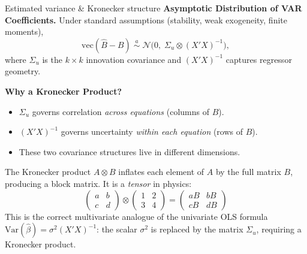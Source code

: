 \documentclass{beamer}
\begin{document}
\begin{frame}{Estimated variance \& Kronecker structure}
\small
\textbf{Asymptotic Distribution of VAR Coefficients.}
Under standard assumptions (stability, weak exogeneity, finite moments),
\[
\mathrm{vec}(\widehat{B}-B)
\;\overset{a}{\sim}\;
\mathcal{N}\!\big(0,\;\Sigma_u \otimes (X'X)^{-1}\big),
\]
where $\Sigma_u$ is the $k\times k$ innovation covariance and $(X'X)^{-1}$ captures regressor geometry.

\medskip

\textbf{Why a Kronecker Product?}
\begin{itemize}
\item $\Sigma_u$ governs correlation \emph{across equations} (columns of $B$).
\item $(X'X)^{-1}$ governs uncertainty \emph{within each equation} (rows of $B$).
\item These two covariance structures live in different dimensions.
\end{itemize}

The Kronecker product $A\otimes B$ inflates each element of $A$ by the full
matrix $B$, producing a block matrix. It is a \textit{tensor} in physics:
\[
\begin{pmatrix}
a & b \\ c & d
\end{pmatrix}
\otimes
\begin{pmatrix}
1 & 2 \\ 3 & 4
\end{pmatrix}
=
\begin{pmatrix}
aB & bB\\
cB & dB
\end{pmatrix}
\]
This is the correct multivariate analogue of the univariate OLS formula $\mathrm{Var}(\widehat{\beta})=\sigma^2 (X'X)^{-1}$: the scalar $\sigma^2$ is replaced by the matrix $\Sigma_u$, requiring a Kronecker product.
\end{frame}
\end{document}
